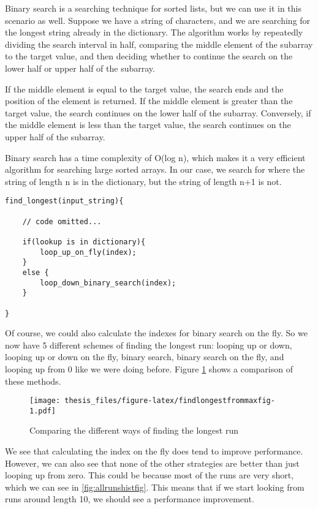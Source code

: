\documentclass[12pt,twoside]{reedthesis}
\begin{document}
Binary search is a searching technique for sorted lists, but we can use it in this scenario as well. Suppose we have a string of characters, and we are searching for the longest string already in the dictionary. The algorithm works by repeatedly dividing the search interval in half, comparing the middle element of the subarray to the target value, and then deciding whether to continue the search on the lower half or upper half of the subarray.

If the middle element is equal to the target value, the search ends and the position of the element is returned. If the middle element is greater than the target value, the search continues on the lower half of the subarray. Conversely, if the middle element is less than the target value, the search continues on the upper half of the subarray.

Binary search has a time complexity of O(log n), which makes it a very efficient algorithm for searching large sorted arrays. In our case, we search for where the string of length n is in the dictionary, but the string of length n+1 is not.
\begin{verbatim}
find_longest(input_string){

    // code omitted...

    if(lookup is in dictionary){
        loop_up_on_fly(index);
    }
    else {
        loop_down_binary_search(index);
    }
    
}
\end{verbatim}
Of course, we could also calculate the indexes for binary search on the fly. So we now have 5 different schemes of finding the longest run: looping up or down, looping up or down on the fly, binary search, binary search on the fly, and looping up from 0 like we were doing before. Figure \ref{fig:findlongestfrommaxfig} shows a comparison of these methods.
\begin{figure}
\centering
\texttt{[image: thesis\_files/figure-latex/findlongestfrommaxfig-1.pdf]}
\caption{\label{fig:findlongestfrommaxfig}Comparing the different ways of finding the longest run}
\end{figure}
We see that calculating the index on the fly does tend to improve performance. However, we can also see that none of the other strategies are better than just looping up from zero. This could be because most of the runs are very short, which we can see in \ref{fig:allrunshistfig}. This means that if we start looking from runs around length 10, we should see a performance improvement.
\end{document}

